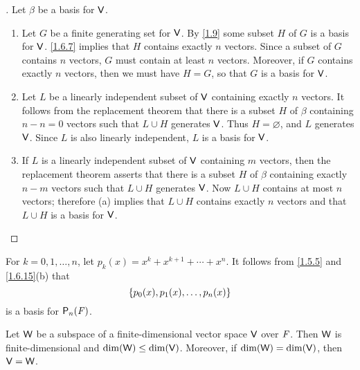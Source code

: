 \begin{proof}[]
  Let \(\beta\) be a basis for \(\mathsf{V}\).
  \begin{enumerate}
    \item Let \(G\) be a finite generating set for \(\mathsf{V}\).
          By \cref{1.9} some subset \(H\) of \(G\) is a basis for \(\mathsf{V}\).
          \cref{1.6.7} implies that \(H\) contains exactly \(n\) vectors.
          Since a subset of \(G\) contains \(n\) vectors, \(G\) must contain at least \(n\) vectors.
          Moreover, if \(G\) contains exactly \(n\) vectors, then we must have \(H = G\), so that \(G\) is a basis for \(\mathsf{V}\).
    \item Let \(L\) be a linearly independent subset of \(\mathsf{V}\) containing exactly \(n\) vectors.
          It follows from the replacement theorem that there is a subset \(H\) of \(\beta\) containing \(n - n = 0\) vectors such that \(L \cup H\) generates \(\mathsf{V}\).
          Thus \(H = \varnothing\), and \(L\) generates \(\mathsf{V}\).
          Since \(L\) is also linearly independent, \(L\) is a basis for \(\mathsf{V}\).
    \item If \(L\) is a linearly independent subset of \(\mathsf{V}\) containing \(m\) vectors, then the replacement theorem asserts that there is a subset \(H\) of \(\beta\) containing exactly \(n - m\) vectors such that \(L \cup H\) generates \(\mathsf{V}\).
          Now \(L \cup H\) contains at most \(n\) vectors;
          therefore (a) implies that \(L \cup H\) contains exactly \(n\) vectors and that \(L \cup H\) is a basis for \(\mathsf{V}\).
  \end{enumerate}
\end{proof}

\begin{eg}\label{1.6.16}
  For \(k = 0, 1, \dots, n\), let \(p_k(x) = x^k + x^{k + 1} + \cdots + x^n\).
  It follows from \cref{1.5.5} and \cref{1.6.15}(b) that
  \[
    \left\lbrace p_0(x), p_1(x), \dots, p_n(x)\right\rbrace
  \]
  is a basis for \(\ps[n]{\F}\).
\end{eg}

\begin{thm}\label{1.11}
  Let \(\mathsf{W}\) be a subspace of a finite-dimensional vector space \(\mathsf{V}\) over \(\mathit{F}\).
  Then \(\mathsf{W}\) is finite-dimensional and \(\dim(\mathsf{W}) \leq \dim(\mathsf{V})\).
  Moreover, if \(\dim(\mathsf{W}) = \dim(\mathsf{V})\), then \(\mathsf{V} = \mathsf{W}\).
\end{thm}

